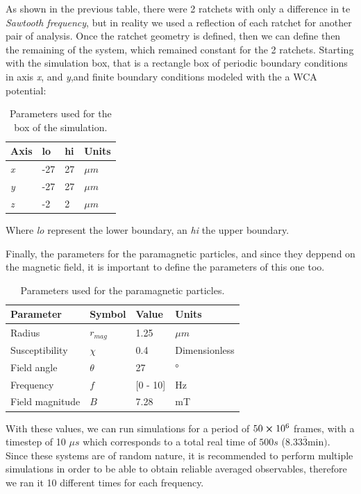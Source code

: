 As shown in the previous table, there were 2 ratchets with only a difference in te \textit{Sawtooth frequency}, but in reality we used a reflection of each ratchet for another pair of analysis. Once the ratchet geometry is defined, then we can define then the remaining of the system, which remained constant for the 2 ratchets. Starting with the simulation box, that is a rectangle box of periodic boundary conditions in axis \textit{x}, and \textit{y},and finite boundary conditions modeled with the a WCA potential:



\begin{table}[H]
\centering
\caption[Simulation box physical parameters.]{Parameters used for the box of the simulation.}
\begin{tabular}{l l l l}
\hline
Axis & lo  & hi & Units \\
\hline
\textit{x} & -27 & 27 & \( \mu m\) \\
\textit{y} & -27 & 27 & \( \mu m\) \\
\textit{z} & -2  & 2   & \( \mu m\)\\ 
\hline
\end{tabular}
\end{table}

Where \textit{lo} represent the lower boundary, an \textit{hi} the upper boundary.

Finally, the parameters for the paramagnetic particles, and since they deppend on the magnetic field, it is important to define the parameters of this one too.


\begin{table}[H]
\centering
\caption[Paramagnetic colloids parameters.]{Parameters used for the paramagnetic particles.}
\begin{tabular}{l l l l}
\hline
Parameter & Symbol  & Value & Units \\
\hline
Radius & $r_{mag}$ &  1.25 &\( \mu m\) \\
Susceptibility & $\chi$ & 0.4 & Dimensionless\\
Field angle & $\theta$ & 27 & °\\
Frequency & $f$ & [0 - 10] & Hz\\
Field magnitude & $B$ & 7.28 & mT\\
\hline
\end{tabular}
\end{table}

With these values, we can run simulations for a period of $50 \cross 10^6$ frames, with a timestep of 10 $\mu s$ which corresponds to a total real time of $500 s$ ($8.33\bar{3} \mathrm{min})$. Since these systems are of random nature, it is recommended to perform multiple simulations in order to be able to obtain reliable averaged observables, therefore we ran it 10 different times for each frequency.

